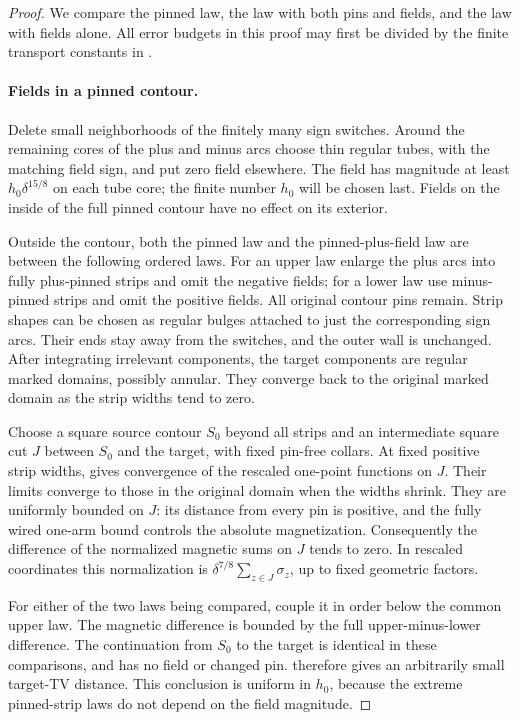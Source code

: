 \begin{proof}
We compare the pinned law, the law with both pins and fields, and the
law with fields alone.  All error budgets in this proof may first be
divided by the finite transport constants in .

\paragraph{Fields in a pinned contour.}
Delete small neighborhoods of the finitely many sign switches.  Around
the remaining cores of the plus and minus arcs choose thin regular
tubes, with the matching field sign, and put zero field elsewhere.
The field has magnitude at least $h_0\delta^{15/8}$ on each tube core;
the finite number $h_0$ will be chosen last.  Fields on the inside of
the full pinned contour have no effect on its exterior.

Outside the contour, both the pinned law and the pinned-plus-field law
are between the following ordered laws.  For an upper law enlarge the
plus arcs into fully plus-pinned strips and omit the negative fields;
for a lower law use minus-pinned strips and omit the positive fields.
All original contour pins remain.  Strip shapes can be chosen as
regular bulges attached to just the corresponding sign arcs.  Their
ends stay away from the switches, and the outer wall is unchanged.
After integrating irrelevant components, the target components are
regular marked domains, possibly annular.  They converge back to the
original marked domain as the strip widths tend to zero.

Choose a square source contour $S_0$ beyond all strips and an
intermediate square cut $J$ between $S_0$ and the target, with fixed
pin-free collars.  At fixed positive strip widths,
 gives convergence of the rescaled one-point functions
on $J$.  Their limits converge to those in the original domain when
the widths shrink.  They are uniformly bounded on $J$: its distance
from every pin is positive, and the fully wired one-arm bound controls
the absolute magnetization.  Consequently the difference of the
normalized magnetic sums on $J$ tends to zero.  In rescaled coordinates
this normalization is $\delta^{7/8}\sum_{z\in J}\sigma_z$, up to
fixed geometric factors.

For either of the two laws being compared, couple it in order below
the common upper law.  The magnetic difference is bounded by the full
upper-minus-lower difference.  The continuation from $S_0$ to the
target is identical in these comparisons, and has no field or changed
pin.   therefore gives an arbitrarily small target-TV
distance.  This conclusion is uniform in $h_0$, because the extreme
pinned-strip laws do not depend on the field magnitude.


\end{proof}
